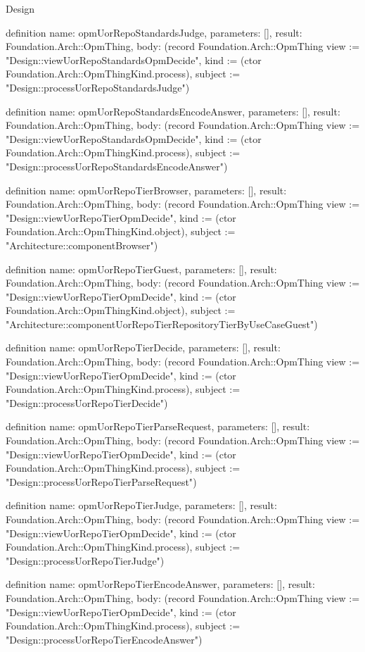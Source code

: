 \begin{lexlean}{Design}
\begin{semanticmodule}
definition{
  name: opmUorRepoStandardsJudge,
  parameters: [],
  result: Foundation.Arch::OpmThing,
  body: (record Foundation.Arch::OpmThing {view := "Design::viewUorRepoStandardsOpmDecide", kind := (ctor Foundation.Arch::OpmThingKind.process), subject := "Design::processUorRepoStandardsJudge"})
}

definition{
  name: opmUorRepoStandardsEncodeAnswer,
  parameters: [],
  result: Foundation.Arch::OpmThing,
  body: (record Foundation.Arch::OpmThing {view := "Design::viewUorRepoStandardsOpmDecide", kind := (ctor Foundation.Arch::OpmThingKind.process), subject := "Design::processUorRepoStandardsEncodeAnswer"})
}

definition{
  name: opmUorRepoTierBrowser,
  parameters: [],
  result: Foundation.Arch::OpmThing,
  body: (record Foundation.Arch::OpmThing {view := "Design::viewUorRepoTierOpmDecide", kind := (ctor Foundation.Arch::OpmThingKind.object), subject := "Architecture::componentBrowser"})
}

definition{
  name: opmUorRepoTierGuest,
  parameters: [],
  result: Foundation.Arch::OpmThing,
  body: (record Foundation.Arch::OpmThing {view := "Design::viewUorRepoTierOpmDecide", kind := (ctor Foundation.Arch::OpmThingKind.object), subject := "Architecture::componentUorRepoTierRepositoryTierByUseCaseGuest"})
}

definition{
  name: opmUorRepoTierDecide,
  parameters: [],
  result: Foundation.Arch::OpmThing,
  body: (record Foundation.Arch::OpmThing {view := "Design::viewUorRepoTierOpmDecide", kind := (ctor Foundation.Arch::OpmThingKind.process), subject := "Design::processUorRepoTierDecide"})
}

definition{
  name: opmUorRepoTierParseRequest,
  parameters: [],
  result: Foundation.Arch::OpmThing,
  body: (record Foundation.Arch::OpmThing {view := "Design::viewUorRepoTierOpmDecide", kind := (ctor Foundation.Arch::OpmThingKind.process), subject := "Design::processUorRepoTierParseRequest"})
}

definition{
  name: opmUorRepoTierJudge,
  parameters: [],
  result: Foundation.Arch::OpmThing,
  body: (record Foundation.Arch::OpmThing {view := "Design::viewUorRepoTierOpmDecide", kind := (ctor Foundation.Arch::OpmThingKind.process), subject := "Design::processUorRepoTierJudge"})
}

definition{
  name: opmUorRepoTierEncodeAnswer,
  parameters: [],
  result: Foundation.Arch::OpmThing,
  body: (record Foundation.Arch::OpmThing {view := "Design::viewUorRepoTierOpmDecide", kind := (ctor Foundation.Arch::OpmThingKind.process), subject := "Design::processUorRepoTierEncodeAnswer"})
}


\end{semanticmodule}
\end{lexlean}
